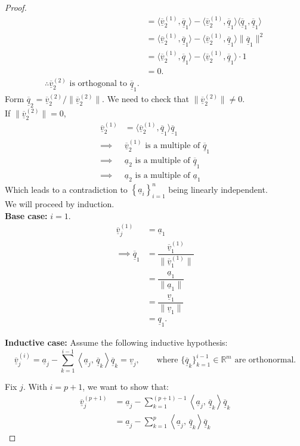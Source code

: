 \documentclass{article}
\newcommand{\mgs}[1] {\underline{\overline{#1}}}
\newcommand{\cgs}[1] {\underline{#1}}
\newcommand{\mgzz}[2] {\ensuremath{\underline{\overline{#1}}}_{#2}}
\newcommand{\mgz}[3] {\ensuremath{\underline{\overline{#1}}}_{#2}^{(#3)}}
\newcommand{\cgz}[2] {\ensuremath{\underline{#1}}_{#2}}
\newcommand{\brackit}[2] {\ensuremath{\left\langle #1,\,#2 \right\rangle}}
\begin{document}
\begin{enumerate}
\begin{proof}
\begin{align*}
    &= \langle \mgs{v}_2^{(1)}, \mgs{q}_1 \rangle - \langle \mgs{v}_2^{(1)}, \mgs{q}_1 \rangle \langle \mgs{q}_1, \mgs{q}_1 \rangle \\
    &= \langle \mgs{v}_2^{(1)}, \mgs{q}_1 \rangle - \langle \mgs{v}_2^{(1)}, \mgs{q}_1 \rangle  \|\mgs{q}_1\|^2 \\
    &= \langle \mgs{v}_2^{(1)}, \mgs{q}_1 \rangle - \langle \mgs{v}_2^{(1)}, \mgs{q}_1 \rangle \cdot 1 \\
    &= 0. \\
    \therefore \mgs{v}_2^{(2)} \text{ is orthogonal to } \mgs{q}_1.
  \end{align*}
  Form $\mgs{q}_2 = \mgs{v}_2^{(2)} / \| \mgs{v}_2^{(2)} \|$. We need to check that $\| \mgs{v}_2^{(2)} \| \neq 0$. \\
  If $\| \mgs{v}_2^{(2)}\| = 0 $, 
  \begin{align*}
  \mgs{v}_2^{(1)} &= \langle \mgs{v}_2^{(1)}, \mgs{q}_1 \rangle \mgs{q}_1 \\
  \implies &\mgs{v}_2^{(1)} \text{ is a multiple of } \mgs{q}_1 \\
  \implies &\cgs{a}_2 \text{ is a multiple of } \mgs{q}_1 \\ 
  \implies &\cgs{a}_2 \text{ is a multiple of } \cgs{a}_1
  \end{align*}
  Which leads to a contradiction to $\left\{ \cgs{a}_i \right\}_{i=1}^n$  being linearly independent. \\
  We will proceed by induction.\\
  \textbf{Base case:} $i=1$.
  \begin{align*}
    \mgz{v}{j}{1} &= \cgz{a}{1} \\
    \implies \mgzz{q}{1} &= \dfrac{\mgz{v}{1}{1}}{\| \mgz{v}{1}{1} \|} \\
    &= \dfrac{\cgz{a}{1}}{\| \cgz{a}{1} \|} \\
    &= \dfrac{\cgz{v}{1}}{\| \cgz{v}{1} \|} \\
    &= \cgz{q}{1}.
  \end{align*}
  
  \textbf{Inductive case:}
  Assume the following inductive hypothesis: 
  \begin{equation} \label{eq:indhyp}
    \mgz{v}{j}{i} = \cgz{a}{j} - \sum\limits_{k=1}^{i-1} \brackit{\cgz{a}{j}}{\mgzz{q}{k}}\mgzz{q}{k} = \cgz{v}{j}, \qquad \text{where } \{ \mgzz{q}{k} \}_{k=1}^{i-1} \in \mathbb{R}^m \text{ are orthonormal.}
  \end{equation}

  Fix $j$. With $i = p + 1$, we want to show that:
  \begin{align*} \label{eq:indcase}
    \mgz{v}{j}{p+1} &= \cgz{a}{j} - \sum\limits_{k=1}^{(p+1)-1} \brackit{\cgz{a}{j}}{\mgzz{q}{k}}\mgzz{q}{k} \\
    &= \cgz{a}{j} - \sum\limits_{k=1}^{p} \brackit{\cgz{a}{j}}{\mgzz{q}{k}}\mgzz{q}{k}
  \end{align*}
  

\end{proof}
\end{enumerate}
\end{document}
